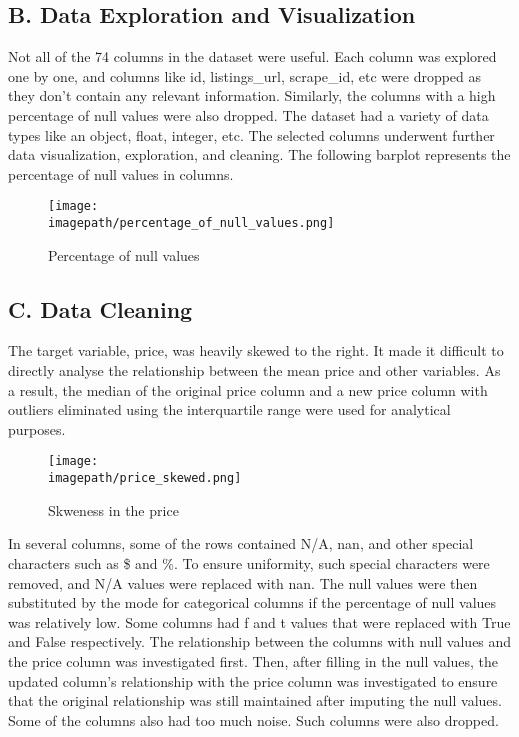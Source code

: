 \documentclass[conference]{IEEEtran}
\newcommand{\imagepath}{C:/Users/Lenovo/Desktop/SEM 6/BIG DATA/BIG_DATA_COURSEWORK/Images for Latex/}
\begin{document}
\subsection*{\centering B. Data Exploration and Visualization}
Not all of the 74 columns in the dataset were useful. Each column was explored one by one, and columns like id, listings\_url, scrape\_id, etc were dropped as they don’t contain any relevant information. Similarly, the columns with a high percentage of null values were also dropped. The dataset had a variety of data types like an object, float, integer, etc. The selected columns underwent further data visualization, exploration, and cleaning. The following barplot represents the percentage of null values in columns. 


\begin{figure}[H]
  \centering
  \texttt{[image: \\imagepath/percentage\_of\_null\_values.png]}
  \caption{Percentage of null values}
  \label{fig:your_label}
\end{figure}

\subsection*{\centering C. Data Cleaning}
The target variable, price, was heavily skewed to the right. It made it difficult to directly analyse the relationship between the mean price and other variables. As a result, the median of the original price column and a new price column with outliers eliminated using the interquartile range were used for analytical purposes.

\begin{figure}[H]
  \centering
  \texttt{[image: \\imagepath/price\_skewed.png]}
  \caption{Skweness in the price}
  \label{fig:your_label}
\end{figure}

In several columns, some of the rows contained N/A, nan, and other special characters such as \$ and \%. To ensure uniformity, such special characters were removed, and N/A values were replaced with nan. The null values were then substituted by the mode for categorical columns if the percentage of null values was relatively low.  Some columns had f and t values that were replaced with True and False respectively. The relationship between the columns with null values and the price column was investigated first. Then, after filling in the null values, the updated column’s relationship with the price column was investigated to ensure that the original relationship was still maintained after imputing the null values. Some of the columns also had too much noise. Such columns were also dropped. 
\end{document}
